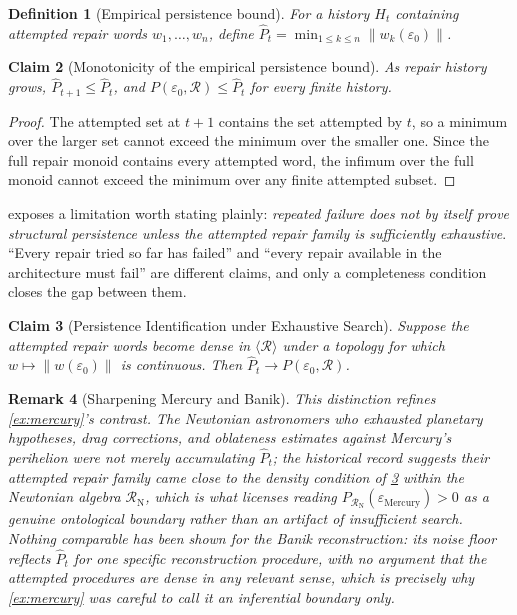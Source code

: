 \documentclass[12pt]{report}
\newtheorem{definition}{Definition}[section]
\newtheorem{claim}[definition]{Claim}
\newtheorem{remark}[definition]{Remark}
\begin{document}
\begin{definition}[Empirical persistence bound]
\label{def:empirical-persistence}
For a history $H_t$ containing attempted repair words $w_1,\ldots,w_n$,
define $\widehat{P}_t = \min_{1 \leq k \leq n} \|w_k(\varepsilon_0)\|$.
\end{definition}

\begin{claim}[Monotonicity of the empirical persistence bound]
\label{thm:empirical-persistence}
As repair history grows, $\widehat{P}_{t+1} \leq \widehat{P}_t$, and
$P(\varepsilon_0,\mathcal{R}) \leq \widehat{P}_t$ for every finite
history.
\end{claim}

\begin{proof}
The attempted set at $t+1$ contains the set attempted by $t$, so a
minimum over the larger set cannot exceed the minimum over the smaller
one. Since the full repair monoid contains every attempted word, the
infimum over the full monoid cannot exceed the minimum over any finite
attempted subset.
\end{proof}

 exposes a limitation worth stating
plainly: \emph{repeated failure does not by itself prove structural
persistence unless the attempted repair family is sufficiently
exhaustive}. ``Every repair tried so far has failed'' and ``every repair
available in the architecture must fail'' are different claims, and only
a completeness condition closes the gap between them.

\begin{claim}[Persistence Identification under Exhaustive Search]
\label{thm:exhaustive-persistence}
Suppose the attempted repair words become dense in $\langle\mathcal{R}\rangle$
under a topology for which $w \mapsto \|w(\varepsilon_0)\|$ is
continuous. Then $\widehat{P}_t \to P(\varepsilon_0,\mathcal{R})$.
\end{claim}

\begin{remark}[Sharpening Mercury and Banik]
\label{rem:mercury-banik-sharpened}
This distinction refines \cref{ex:mercury}'s contrast. The Newtonian
astronomers who exhausted planetary hypotheses, drag corrections, and
oblateness estimates against Mercury's perihelion were not merely
accumulating $\widehat{P}_t$; the historical record suggests their
attempted repair family came close to the density condition of
\cref{thm:exhaustive-persistence} within the Newtonian algebra
$\mathcal{R}_{\mathrm{N}}$, which is what licenses reading
$P_{\mathcal{R}_{\mathrm{N}}}(\varepsilon_{\mathrm{Mercury}}) > 0$ as a
genuine ontological boundary rather than an artifact of insufficient
search. Nothing comparable has been shown for the Banik reconstruction:
its noise floor reflects $\widehat{P}_t$ for one specific reconstruction
procedure, with no argument that the attempted procedures are dense in
any relevant sense, which is precisely why \cref{ex:mercury} was careful
to call it an inferential boundary only.
\end{remark}
\end{document}

